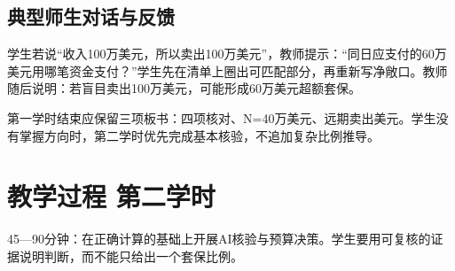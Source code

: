 \documentclass[lang=cn,11pt,oneside,openany,chinesefont=nofont,color=blue,titlestyle=hang]{elegantbook}
\begin{document}
\subsection*{典型师生对话与反馈}

学生若说“收入100万美元，所以卖出100万美元”，教师提示：“同日应支付的60万美元用哪笔资金支付？”学生先在清单上圈出可匹配部分，再重新写净敞口。教师随后说明：若盲目卖出100万美元，可能形成60万美元超额套保。

第一学时结束应保留三项板书：四项核对、N=40万美元、远期卖出美元。学生没有掌握方向时，第二学时优先完成基本核验，不追加复杂比例推导。

\clearpage

\section{教学过程 第二学时}\label{sec:g8}

45—90分钟：在正确计算的基础上开展AI核验与预算决策。学生要用可复核的证据说明判断，而不能只给出一个套保比例。
\end{document}
